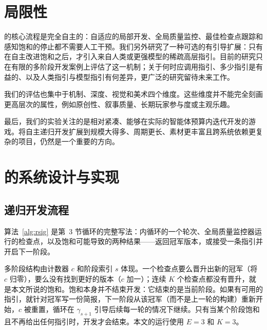 \section{局限性}\label{app:limit}
\rsig{} 的核心流程是完全自主的：自适应的局部开发、全局质量监控、最佳检查点跟踪和感知饱和的停止都不需要人工干预。我们另外研究了一种可选的有引导扩展：只有在自主改进饱和之后，才引入来自人类或更强模型的稀疏高层指引。目前的研究只在有限的多阶段开发案例上评估了这一机制；关于何时应调用指引、多少指引是有益的、以及人类指引与模型指引有何差异，更广泛的研究留待未来工作。

我们的评估也集中于机制、深度、视觉和美术四个维度。这些维度并不能完全刻画更高层次的属性，例如原创性、叙事质量、长期玩家参与度或主观乐趣。

最后，我们的实验关注的是相对紧凑、能够在实际的智能体预算内迭代开发的游戏。将自主递归开发扩展到规模大得多、周期更长、素材更丰富且跨系统依赖更复杂的项目，仍然是一个重要的方向。

\section{\rsig{} 的系统设计与实现}\label{app:system}
\subsection{递归开发流程}\label{app:proc}
算法~\ref{alg:rsig} 是第~3 节循环的完整写法：内循环的一个轮次、全局质量监控器运行的检查点，以及饱和可能导致的两种结果——返回冠军版本，或接受一条指引并开启下一阶段。

多阶段结构由计数器 $c$ 和阶段索引 $s$ 体现。一个检查点要么晋升出新的冠军（将 $c$ 归零），要么没有找到更好的版本（$c$ 加一）；连续 $K$ 个检查点都没有晋升，就是本文所说的饱和。饱和本身并不结束开发：它结束的是当前阶段。如果有可用的指引，就针对冠军写一份简报，下一阶段从该冠军（而不是上一轮的构建）重新开始，$c$ 被重置，循环在 $\gamma_{s+1}$ 引导后续每一轮的情况下继续。只有当某个阶段饱和且不再给出任何指引时，开发才会结束。本文的运行使用 $E = 3$ 和 $K = 3$。

